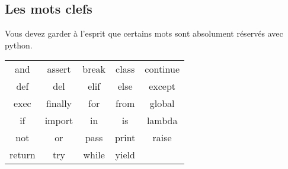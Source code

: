 \subsection{Les mots clefs}

Vous devez garder à l'esprit que certains mots sont absolument réservés avec python.

\begin{center}
\begin{tabular}{ccccc}
and    & assert  & break & class & continue\\
def    & del 	 & elif  & else  & except\\
exec   & finally & for 	 & from  & global\\
if     & import  & in    & is 	 & lambda\\
not    & or 	 & pass  & print & raise\\
return & try 	 & while & yield &       \\
\end{tabular}
\end{center}

\vfill
